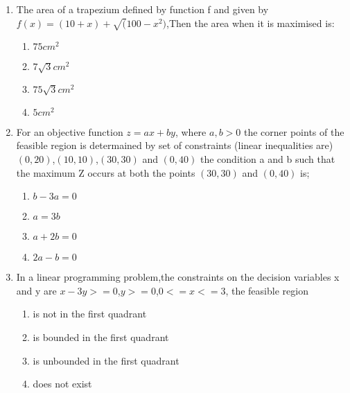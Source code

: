 \documentclass{article}
\begin{document}
\begin{enumerate}
	\item The area of a trapezium  defined by function f and given by $f(x) = (10+x)+\sqrt(100-x^2)$,Then the area when it is maximised is:
		\begin{enumerate}[label=(\Alph*)]
			\item $75cm^2$
			\item $7\sqrt{3}cm^2$
			\item $75\sqrt{3}cm^2$
			\item $5cm^2$
		\end{enumerate}
	\item For an objective function $z =ax+by$, where $a,b >0$ the corner points of the feasible region is determained by set of constraints (linear inequalities are) $(0,20)$,$(10,10)$,$(30,30)$ and $(0,40)$ the condition a and b such that the maximum Z occurs at both the points $(30,30)$ and $(0,40)$ is;
		\begin{enumerate}[label=(\Alph*)]
			\item $b-3a=0$
			\item $a=3b$
			\item $a+2b=0$
			\item $2a-b=0$
		\end{enumerate}
	\item In a linear programming problem,the constraints on the decision variables x and y are $x-3y>=0$,$y>=0$,$0<=x<=3$, the feasible region 
		\begin{enumerate}[label=(\Alph*)]
			\item is not in the first quadrant
			\item is bounded in the first quadrant
			\item is unbounded in the first quadrant
			\item does not exist
		\end{enumerate}

 \end{enumerate}
 
\end{document}
